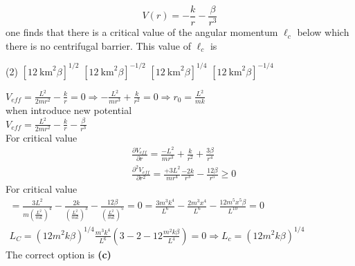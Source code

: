 \begin{enumerate}
\begin{minipage}{\textwidth}
	$$
	V(r)=-\frac{k}{r}-\frac{\beta}{r^{3}}
	$$
	one finds that there is a critical value of the angular momentum $\ell_{c}$ below which there is no centrifugal barrier. This value of $\ell_{c}$ is
\end{minipage}
\begin{tasks}(2)
	\task[\textbf{A.}] $\left[12 \mathrm{~km}^{2} \beta\right]^{1 / 2}$
	\task[\textbf{B.}]$\left[12 \mathrm{~km}^{2} \beta\right]^{-1 / 2}$
	\task[\textbf{C.}]$\left[12 \mathrm{~km}^{2} \beta\right]^{1 / 4}$
	\task[\textbf{D.}]$\left[12 \mathrm{~km}^{2} \beta\right]^{-1 / 4}$
\end{tasks}
\begin{answer}
	$V_{e f f}=\frac{L^{2}}{2 m r^{2}}-\frac{k}{r}=0 \Rightarrow-\frac{L^{2}}{m r^{3}}+\frac{k}{r^{2}}=0 \Rightarrow r_{0}=\frac{L^{2}}{m k}$\\
	when introduce new potential\\
	$
	V_{e f f}=\frac{L^{2}}{2 m r^{2}}-\frac{k}{r}-\frac{\beta}{r^{3}}
	$\\
	For critical value
	\begin{align*}
	&\frac{\partial V_{e f f}}{\partial r}=\frac{-L^{2}}{m r^{3}}+\frac{k}{r^{2}}+\frac{3 \beta}{r^{4}} \\
	&\frac{\partial^{2} V_{e f f}}{\partial r^{2}}=\frac{+3 L^{2}}{m r^{4}} \frac{-2 k}{r^{3}}-\frac{12 \beta}{r^{5}} \geq 0
	\end{align*}
	For critical value\\
	$
	\begin{gathered}
	=\frac{3 L^{2}}{m\left(\frac{L^{2}}{m k}\right)^{4}}-\frac{2 k}{\left(\frac{L^{2}}{m k}\right)^{3}}-\frac{12 \beta}{\left(\frac{L^{2}}{m k}\right)^{5}}=0=\frac{3 m^{3} k^{4}}{L^{6}}-\frac{2 m^{3} x^{4}}{L^{6}}-\frac{12 m^{5} x^{5} \beta}{L^{10}}=0 \\
	L_{C}=\left(12 m^{2} k \beta\right)^{1 / 4} \frac{m^{3} k^{4}}{L^{6}}\left(3-2-12 \frac{m^{2} k \beta}{L^{4}}\right)=0 \Rightarrow L_{c}=\left(12 m^{2} k \beta\right)^{1 / 4}
	\end{gathered}
	$\\
	The correct option is \textbf{(c)}
\end{answer}
\end{enumerate}


